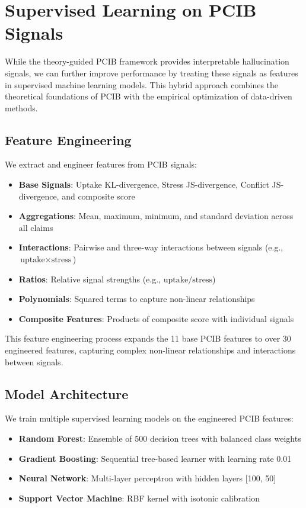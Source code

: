 \section{Supervised Learning on PCIB Signals}
\label{sec:stacking}

While the theory-guided PCIB framework provides interpretable hallucination signals, 
we can further improve performance by treating these signals as features in supervised 
machine learning models. This hybrid approach combines the theoretical foundations of PCIB 
with the empirical optimization of data-driven methods.

\subsection{Feature Engineering}
We extract and engineer features from PCIB signals:

\begin{itemize}
  \item \textbf{Base Signals}: Uptake KL-divergence, Stress JS-divergence, Conflict JS-divergence, and composite score
  \item \textbf{Aggregations}: Mean, maximum, minimum, and standard deviation across all claims
  \item \textbf{Interactions}: Pairwise and three-way interactions between signals (e.g., $\text{uptake} \times \text{stress}$)
  \item \textbf{Ratios}: Relative signal strengths (e.g., $\text{uptake}/\text{stress}$)
  \item \textbf{Polynomials}: Squared terms to capture non-linear relationships
  \item \textbf{Composite Features}: Products of composite score with individual signals
\end{itemize}

This feature engineering process expands the 11 base PCIB features to over 30 engineered features, 
capturing complex non-linear relationships and interactions between signals.

\subsection{Model Architecture}
We train multiple supervised learning models on the engineered PCIB features:

\begin{itemize}
  \item \textbf{Random Forest}: Ensemble of 500 decision trees with balanced class weights
  \item \textbf{Gradient Boosting}: Sequential tree-based learner with learning rate 0.01
  \item \textbf{Neural Network}: Multi-layer perceptron with hidden layers [100, 50]
  \item \textbf{Support Vector Machine}: RBF kernel with isotonic calibration
\end{itemize}

